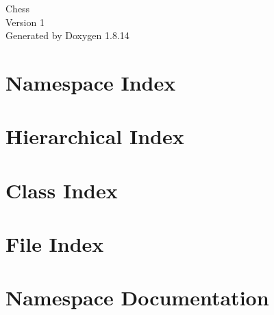 \documentclass[twoside]{book}
\newcommand{\+}{\discretionary{\mbox{\scriptsize$\hookleftarrow$}}{}{}}
\newcommand{\clearemptydoublepage}{%
  \newpage{\pagestyle{empty}\cleardoublepage}%
}
\begin{document}
\hypersetup{pageanchor=false,
             bookmarksnumbered=true,
             pdfencoding=unicode
            }
\begin{titlepage}
\vspace*{7cm}
\begin{center}%
{\Large Chess \\[1ex]\large Version 1 }\\
\vspace*{1cm}
{\large Generated by Doxygen 1.8.14}\\
\end{center}
\end{titlepage}
\clearemptydoublepage
{}
\tableofcontents
\clearemptydoublepage
{}
\hypersetup{pageanchor=true}

\chapter{Namespace Index}

\chapter{Hierarchical Index}

\chapter{Class Index}

\chapter{File Index}

\chapter{Namespace Documentation}







\end{document}
